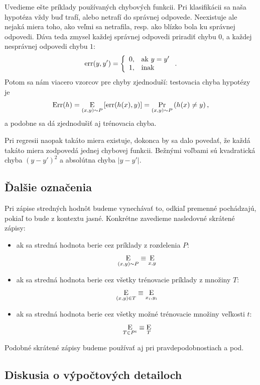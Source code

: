 Uvedieme ešte príklady používaných chybových funkcii.
Pri klasifikácii sa naša hypotéza vždy buď trafí, alebo netrafí do
správnej odpovede. Neexistuje ale nejaká miera toho, ako veľmi sa netrafila,
resp. ako blízko bola ku správnej odpovedi. Dáva teda zmysel každej správnej
odpovedi priradiť chybu $0$, a každej nesprávnej odpovedi chybu $1$:
$$
  \mathrm{err}(y, y') = \left\{
    \begin{array}{ll}
      0, & \text{ak}\ y = y' \\
      1, & \text{inak}
    \end{array}
  \right.
  .
$$
Potom sa nám viacero vzorcov pre chyby zjednoduší: testovacia chyba
hypotézy je
$$\mathrm{Err}(h) = \operatorname*{\mathrm{E}}_{(x, y) \sim P} \left[ \mathrm{err}(h(x), y) \right] = \operatorname*{\mathrm{Pr}}_{(x, y) \sim P} \left( h(x) \neq y \right),$$
a podobne sa dá zjednodušiť aj trénovacia chyba.

Pri regresii naopak takáto miera existuje, dokonca by sa dalo povedať, že
každá takáto miera zodpovedá jednej chybovej funkcii. Bežnými voľbami sú
kvadratická chyba $(y - y')^2$ a absolútna chyba $|y - y'|$.



\subsection{Ďalšie označenia}

Pri zápise stredných hodnôt budeme vynechávať to, odkiaľ premenné pochádzajú,
pokiaľ to bude z kontextu jasné. Konkrétne zavedieme nasledovné skrátené
zápisy:

\begin{itemize}
  \item ak sa stredná hodnota berie cez príklady z rozdelenia $P$:
    $$ \operatorname*{\mathrm{E}}_{(x, y) \sim P} \equiv \operatorname*{\mathrm{E}}_{x, y} $$
  \item ak sa stredná hodnota berie cez všetky trénovacie príklady
    z množiny $T$:
    $$ \operatorname*{\mathrm{E}}_{(x, y) \in T} \equiv \operatorname*{\mathrm{E}}_{x_i, y_i} $$
  \item ak sa stredná hodnota berie cez všetky možné trénovacie
    množiny veľkosti $t$:
    $$ \operatorname*{\mathrm{E}}_{T \in P^t} \equiv \operatorname*{\mathrm{E}}_T $$
\end{itemize}

Podobné skrátené zápisy budeme používať aj pri pravdepodobnostiach
a pod.



\subsection{Diskusia o výpočtových detailoch} \label{ch1:asses}


